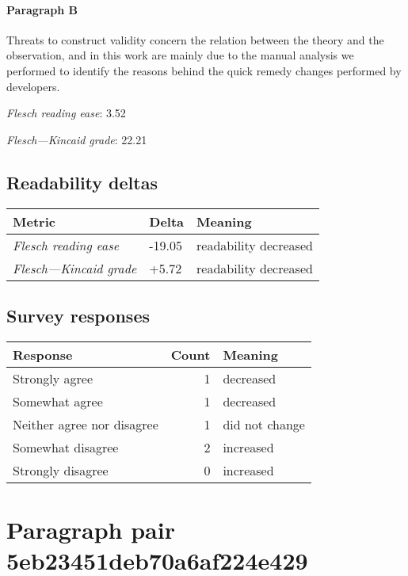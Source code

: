 \paragraph{Paragraph B}
Threats to construct validity concern the relation between the theory and the observation, and in this work are mainly due to the manual analysis we performed to identify the reasons behind the quick remedy changes performed by developers.\par\medskip
\emph{Flesch reading ease}: 3.52\par
\emph{Flesch---Kincaid grade}: 22.21

\subsection{Readability deltas}

\begin{tabular}{lll}
\toprule
               \textbf{Metric} & \textbf{Delta} &       \textbf{Meaning} \\
\midrule
    \emph{Flesch reading ease} &         -19.05 &  readability decreased \\
 \emph{Flesch---Kincaid grade} &          +5.72 &  readability decreased \\
\bottomrule
\end{tabular}

\subsection{Survey responses}
\begin{tabular}{lrl}
\toprule
          \textbf{Response} &  \textbf{Count} & \textbf{Meaning} \\
\midrule
             Strongly agree &               1 &        decreased \\
             Somewhat agree &               1 &        decreased \\
 Neither agree nor disagree &               1 &   did not change \\
          Somewhat disagree &               2 &        increased \\
          Strongly disagree &               0 &        increased \\
\bottomrule
\end{tabular}

\section{Paragraph pair 5eb23451deb70a6af224e429}
